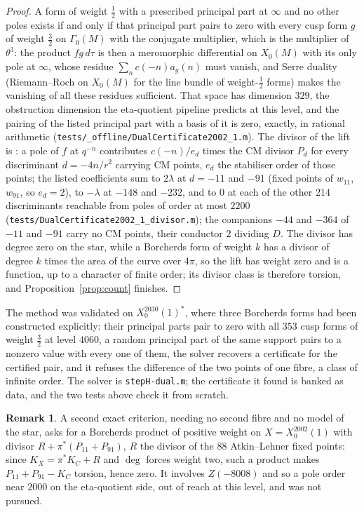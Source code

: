 \documentclass[11pt,reqno]{amsart}
\theoremstyle{plain}
\theoremstyle{definition}
\newtheorem{remark}[theorem]{Remark}
\begin{document}
\begin{proof}
A form of weight $\tfrac12$ with a prescribed principal part at $\infty$ and no other poles exists
if and only if that principal part pairs to zero with every cusp form $g$ of weight $\tfrac32$ on
$\Gamma_0(M)$ with the conjugate multiplier, which is the multiplier of $\theta^3$: the product
$fg\,d\tau$ is then a meromorphic differential on $X_0(M)$ with its only pole at $\infty$, whose
residue $\sum_nc(-n)a_g(n)$ must vanish, and Serre duality (Riemann--Roch on $X_0(M)$ for the line
bundle of weight-$\tfrac12$ forms) makes the vanishing of all these residues sufficient. That space
has dimension $329$, the obstruction dimension the eta-quotient pipeline predicts at this level, and
the pairing of the listed principal part with a basis of it is zero, exactly, in rational arithmetic
(\texttt{tests/\_offline/DualCertificate2002\_1.m}). The divisor of the lift is \cite[Lemma~25]{gy}:
a pole of $f$ at $q^{-n}$ contributes $c(-n)/e_d$ times the CM divisor $P_d$ for every discriminant
$d=-4n/r^2$ carrying CM points, $e_d$ the stabiliser order of those points; the listed coefficients
sum to $2\lambda$ at $d=-11$ and $-91$ (fixed points of $w_{11}$, $w_{91}$, so $e_d=2$), to $-\lambda$ at $-148$
and $-232$, and to $0$ at each of the other $214$ discriminants reachable from poles of order at most
$2200$ (\texttt{tests/DualCertificate2002\_1\_divisor.m}); the companions $-44$ and $-364$ of $-11$
and $-91$ carry no CM points, their conductor $2$ dividing $D$. The divisor has degree zero on the
star, while a Borcherds form of weight $k$ has a divisor of degree $k$ times the area of the curve
over $4\pi$, so the lift has weight zero and is a function, up to a character of finite order; its
divisor class is therefore torsion, and Proposition~\ref{prop:count} finishes.
\end{proof}

The method was validated on $X_0^{2030}(1)^*$, where three Borcherds forms had been constructed
explicitly: their principal parts pair to zero with all $353$ cusp forms of weight $\tfrac32$ at
level $4060$, a random principal part of the same support pairs to a nonzero value with every one
of them, the solver recovers a certificate for the certified pair, and it refuses the difference of
the two points of one fibre, a class of infinite order. The solver is \texttt{stepH-dual.m}; the
certificate it found is banked as data, and the two tests above check it from scratch.

\begin{remark}
A second exact criterion, needing no second fibre and no model of the star, asks for a Borcherds
product of positive weight on $X=X_0^{2002}(1)$ with divisor $R+\pi^*(P_{11}+P_{91})$, $R$ the
divisor of the $88$ Atkin--Lehner fixed points: since $K_X=\pi^*K_C+R$ and $\deg$ forces weight two,
such a product makes $P_{11}+P_{91}-K_C$ torsion, hence zero. It involves $Z(-8008)$ and so a pole
order near $2000$ on the eta-quotient side, out of reach at this level, and was not pursued.
\end{remark}
\end{document}
